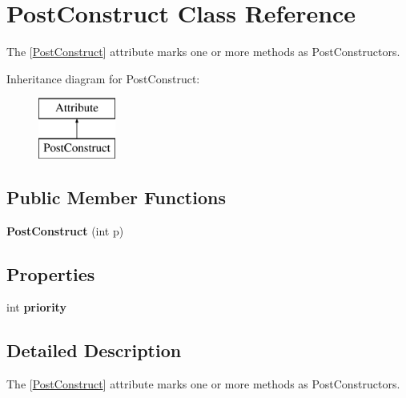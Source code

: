 \hypertarget{class_post_construct}{\section{Post\-Construct Class Reference}
\label{class_post_construct}
}


The {\ttfamily \mbox{[}\hyperlink{class_post_construct}{Post\-Construct}\mbox{]}} attribute marks one or more methods as Post\-Constructors.  


Inheritance diagram for Post\-Construct\-:\begin{figure}[H]
\begin{center}
\leavevmode
\includegraphics[height=2.000000cm]{class_post_construct}
\end{center}
\end{figure}
\subsection*{Public Member Functions}
\begin{DoxyCompactItemize}
\item 
\hypertarget{class_post_construct_af60fdf7855d5e3e26d79922454c72414}{{\bfseries Post\-Construct} (int p)}\label{class_post_construct_af60fdf7855d5e3e26d79922454c72414}

\end{DoxyCompactItemize}
\subsection*{Properties}
\begin{DoxyCompactItemize}
\item 
\hypertarget{class_post_construct_aeaedba1eb582bd7c4e023404ed1c8611}{int {\bfseries priority}}\label{class_post_construct_aeaedba1eb582bd7c4e023404ed1c8611}

\end{DoxyCompactItemize}


\subsection{Detailed Description}
The {\ttfamily \mbox{[}\hyperlink{class_post_construct}{Post\-Construct}\mbox{]}} attribute marks one or more methods as Post\-Constructors. 

